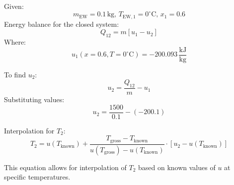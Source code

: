 Given:  
\[
m_{\text{EW}} = 0.1 \, \text{kg}, \, T_{\text{EW},1} = 0^\circ\text{C}, \, x_1 = 0.6
\]  
Energy balance for the closed system:  
\[
Q_{12} = m \left[ u_1 - u_2 \right]
\]  
Where:  
\[
u_1(x = 0.6, T = 0^\circ\text{C}) = -200.093 \, \frac{\text{kJ}}{\text{kg}}
\]  

To find \( u_2 \):  
\[
u_2 = \frac{Q_{12}}{m} - u_1
\]  
Substituting values:  
\[
u_2 = \frac{1500}{0.1} - (-200.1)
\]  

Interpolation for \( T_2 \):  
\[
T_2 = u(T_{\text{known}}) + \frac{T_{\text{gross}} - T_{\text{known}}}{u(T_{\text{gross}}) - u(T_{\text{known}})} \cdot \left[ u_2 - u(T_{\text{known}}) \right]
\]  

This equation allows for interpolation of \( T_2 \) based on known values of \( u \) at specific temperatures.